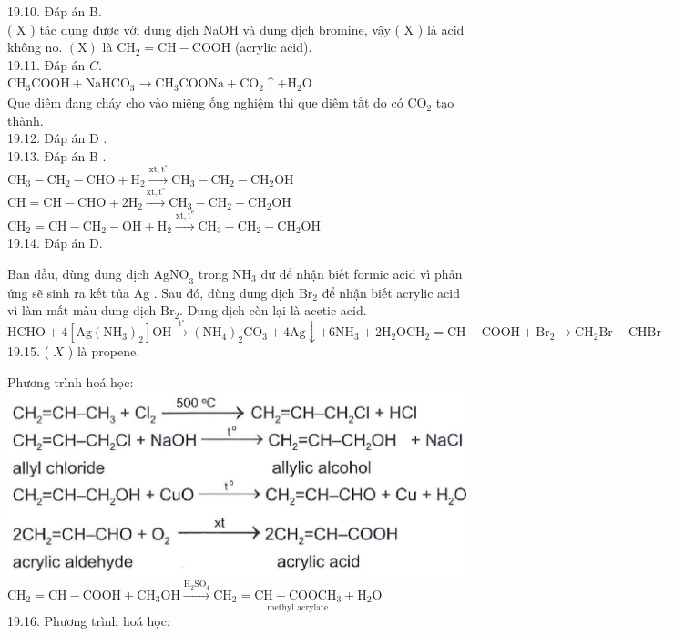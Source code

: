 \documentclass[10pt]{article}
\begin{document}
19.10. Đáp án B.\\
( X ) tác dụng được với dung dịch NaOH và dung dịch bromine, vậy ( X ) là acid không no. $(\mathrm{X})$ là $\mathrm{CH}_{2}=\mathrm{CH}-\mathrm{COOH}$ (acrylic acid).\\
19.11. Đáp án $C$.\\
$\mathrm{CH}_{3} \mathrm{COOH}+\mathrm{NaHCO}_{3} \rightarrow \mathrm{CH}_{3} \mathrm{COONa}+\mathrm{CO}_{2} \uparrow+\mathrm{H}_{2} \mathrm{O}$\\
Que diêm đang cháy cho vào miệng ống nghiệm thì que diêm tắt do có $\mathrm{CO}_{2}$ tạo thành.\\
19.12. Đáp án D .\\
19.13. Đáp án B .\\
$\mathrm{CH}_{3}-\mathrm{CH}_{2}-\mathrm{CHO}+\mathrm{H}_{2} \xrightarrow{\mathrm{xt}, \mathrm{t}^{\circ}} \mathrm{CH}_{3}-\mathrm{CH}_{2}-\mathrm{CH}_{2} \mathrm{OH}$\\
$\mathrm{CH}=\mathrm{CH}-\mathrm{CHO}+2 \mathrm{H}_{2} \xrightarrow{\mathrm{xt}, \mathrm{t}^{\circ}} \mathrm{CH}_{3}-\mathrm{CH}_{2}-\mathrm{CH}_{2} \mathrm{OH}$\\
$\mathrm{CH}_{2}=\mathrm{CH}-\mathrm{CH}_{2}-\mathrm{OH}+\mathrm{H}_{2} \xrightarrow{\mathrm{xt}, \mathrm{t}^{\mathrm{e}}} \mathrm{CH}_{3}-\mathrm{CH}_{2}-\mathrm{CH}_{2} \mathrm{OH}$\\
19.14. Đáp án D.

Ban đầu, dùng dung dịch $\mathrm{AgNO}_{3}$ trong $\mathrm{NH}_{3}$ dư để nhận biết formic acid vì phản ứng sẽ sinh ra kết tủa Ag . Sau đó, dùng dung dịch $\mathrm{Br}_{2}$ để nhận biết acrylic acid vì làm mất màu dung dịch $\mathrm{Br}_{2}$. Dung dịch còn lại là acetic acid.\\
$\mathrm{HCHO}+4\left[\mathrm{Ag}\left(\mathrm{NH}_{3}\right)_{2}\right] \mathrm{OH} \xrightarrow{\mathrm{t}^{\circ}}\left(\mathrm{NH}_{4}\right)_{2} \mathrm{CO}_{3}+4 \mathrm{Ag} \downarrow+6 \mathrm{NH}_{3}+2 \mathrm{H}_{2} \mathrm{O} \mathrm{CH}_{2}=\mathrm{CH}-\mathrm{COOH}+\mathrm{Br}_{2} \rightarrow \mathrm{CH}_{2} \mathrm{Br}-\mathrm{CHBr}-\mathrm{COOH}$\\
19.15. ( $X$ ) là propene.

Phương trình hoá học:\\
\includegraphics[max width=\textwidth, center]{2025_10_23_adad5b98d65ac6665838g-40(1)}\\
$\mathrm{CH}_{2}=\mathrm{CH}-\mathrm{COOH}+\mathrm{CH}_{3} \mathrm{OH} \xrightarrow{\mathrm{H}_{2} \mathrm{SO}_{4}} \underset{\text { methyl acrylate }}{\mathrm{CH}_{2}=\mathrm{CH}-\mathrm{COOCH}_{3}+\mathrm{H}_{2} \mathrm{O}}$\\
19.16. Phương trình hoá học:
\end{document}

